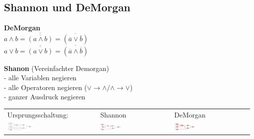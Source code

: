 \subsection{Shannon und DeMorgan}
\begin{multicols}{2}
	\textbf{DeMorgan}\\
	$a \land b = \overline{\overline{(a \land b)}}= \overline{(\overline{a} \lor \overline{b})}$\\
	$a \lor b = \overline{\overline{(a \lor b)}} = \overline{(\overline{a} \land \overline{b})}$

	\textbf{Shanon} (Vereinfachter Demorgan)\\
	- alle Variablen negieren\\
	- alle Operatoren negieren ($\lor \rightarrow \land / \land \rightarrow \lor$)\\
	- ganzer Ausdruck negieren
\end{multicols}
\begin{tabular}{lll}
	Ursprungsschaltung: & Shannon & DeMorgan\\
		\includegraphics[width=0.3\textwidth]{pics/shanonursprung} & 
		\includegraphics[width=0.3\textwidth]{pics/shanonende} &
		\includegraphics[width=0.3\textwidth]{pics/demorganende}\\
\end{tabular}



